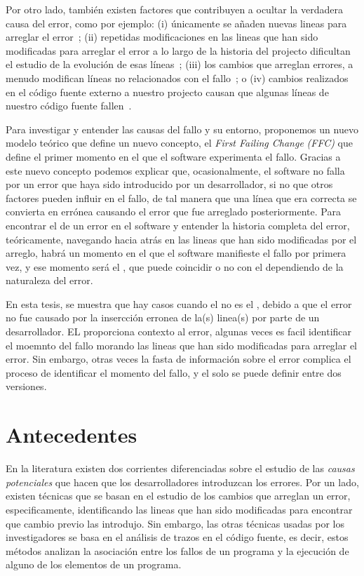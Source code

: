\documentclass[a4paper, 12pt]{book}
\begin{document}
Por otro lado, tambi\'en existen factores que contribuyen a ocultar la verdadera causa del error, como por ejemplo: (i) \'unicamente se a\~naden nuevas lineas para arreglar el error~\cite{da2016framework}; (ii) repetidas modificaciones en las lineas que han sido modificadas para arreglar el error a lo largo de la historia del projecto dificultan el estudio de la evoluci\'on de esas l\'ineas~\cite{servant2017fuzzy}; (iii) los cambios que arreglan errores, a menudo modifican l\'ineas no relacionados con el fallo~\cite{herzig2013impact}; o (iv) cambios realizados en el  c\'odigo fuente externo a nuestro projecto causan que algunas l\'ineas de nuestro c\'odigo fuente fallen~\cite{german2009change}.

Para investigar y entender las causas del fallo y su entorno, proponemos un nuevo modelo te\'orico que define un nuevo concepto, el \emph{First Failing Change} \emph{(FFC)} que define el primer momento en el que el software experimenta el fallo. Gracias a este nuevo concepto podemos explicar que, ocasionalmente, el software no falla por un error que haya sido introducido por un desarrollador, si no que otros factores pueden influir en el fallo, de tal manera que una l\'inea que era correcta se convierta en err\'onea causando el error que fue arreglado posteriormente. Para encontrar el \FFC de un error en el software y entender la historia completa del error, te\'oricamente, navegando hacia atr\'as en las lineas que han sido modificadas por el arreglo, habr\'a un momento en el que el software manifieste el fallo por primera vez, y ese momento ser\'a el \FFC, que puede coincidir o no con el \BIC dependiendo de la naturaleza del error.

En esta tesis, se muestra que hay casos cuando el \FFC no es el \BIC, debido a que el error no fue causado por la insercci\'on erronea de la(s) linea(s) por parte de un desarrollador. EL \FFC proporciona contexto al error, algunas veces es facil identificar el moemnto del fallo morando las lineas que han sido modificadas para arreglar el error. Sin embargo, otras veces la fasta de informaci\'on sobre el error complica el proceso de identificar el momento del fallo, y el \FFC solo se puede definir entre dos versiones.

\section{Antecedentes}

En la literatura existen dos corrientes diferenciadas sobre el estudio de las \emph{causas potenciales} que hacen que los desarrolladores introduzcan los errores. Por un lado, existen t\'ecnicas que se basan en el estudio de los cambios que arreglan un error, especificamente, identificando las lineas que han sido modificadas para encontrar que cambio previo las introdujo. Sin embargo, las otras t\'ecnicas usadas por los investigadores se basa en el an\'alisis de trazos en el c\'odigo fuente, es decir, estos m\'etodos analizan la asociaci\'on entre los fallos de un programa y la ejecuci\'on de alguno de los elementos de un programa.
\end{document}
